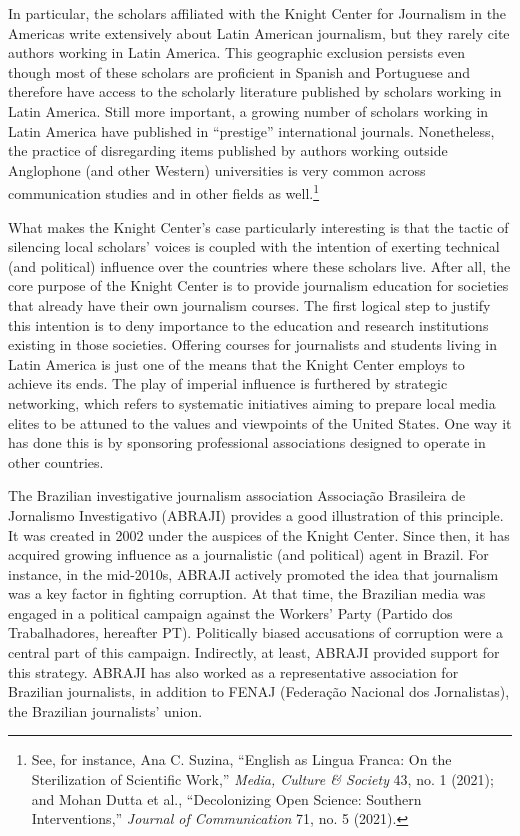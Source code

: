 \documentclass{tufte-handout}
\begin{document}
In particular, the scholars affiliated with the Knight Center for
Journalism in the Americas write extensively about Latin American
journalism, but they rarely cite authors working in Latin America. This
geographic exclusion persists even though most of these scholars are
proficient in Spanish and Portuguese and therefore have access to the
scholarly literature published by scholars working in Latin America.
Still more important, a growing number of scholars working in Latin
America have published in ``prestige'' international journals.
Nonetheless, the practice of disregarding items published by authors
working outside Anglophone (and other Western) universities is very
common across communication studies and in other fields as
well.\footnote{See, for instance, Ana C. Suzina, ``English as Lingua
  Franca: On the Sterilization of Scientific Work,'' \emph{Media,
  Culture \& Society} 43, no. 1 (2021); and Mohan Dutta et al.,
  ``Decolonizing Open Science: Southern Interventions,'' \emph{Journal
  of Communication} 71, no. 5 (2021).}

What makes the Knight Center's case particularly interesting is that the
tactic of silencing local scholars' voices is coupled with the intention
of exerting technical (and political) influence over the countries where
these scholars live. After all, the core purpose of the Knight Center is
to provide journalism education for societies that already have their
own journalism courses. The first logical step to justify this intention
is to deny importance to the education and research institutions
existing in those societies. Offering courses for journalists and
students living in Latin America is just one of the means that the
Knight Center employs to achieve its ends. The play of imperial
influence is furthered by strategic networking, which refers to
systematic initiatives aiming to prepare local media elites to be
attuned to the values and viewpoints of the United States. One way it
has done this is by sponsoring professional associations designed to
operate in other countries.

The Brazilian investigative journalism association Associação Brasileira
de Jornalismo Investigativo (ABRAJI) provides a good illustration of
this principle. It was created in 2002 under the auspices of the Knight
Center. Since then, it has acquired growing influence as a journalistic
(and political) agent in Brazil. For instance, in the mid-2010s, ABRAJI
actively promoted the idea that journalism was a key factor in fighting
corruption. At that time, the Brazilian media was engaged in a political
campaign against the Workers' Party (Partido dos Trabalhadores,
hereafter PT). Politically biased accusations of corruption were a
central part of this campaign. Indirectly, at least, ABRAJI provided
support for this strategy. ABRAJI has also worked as a representative
association for Brazilian journalists, in addition to FENAJ (Federação
Nacional dos Jornalistas), the Brazilian journalists' union.
\end{document}

